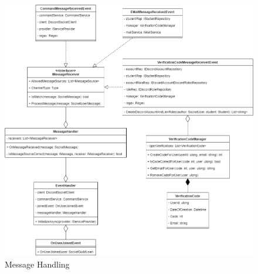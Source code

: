 \documentclass[a4paper, table]{article}
\begin{document}
\begin{figure}[ht]
    \centering
    \hspace*{-2cm}
    \includegraphics[width=1.3\textwidth]{img/MessageHandling.png}
    \caption{Message Handling}
    \label{fig:message-handling}
\end{figure}
\clearpage
\end{document}
